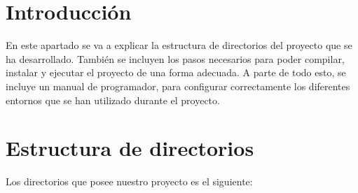
\section{Introducción}

En este apartado se va a explicar la estructura de directorios del proyecto que se ha desarrollado. También se incluyen los pasos necesarios para poder compilar, instalar y ejecutar el proyecto de una forma adecuada. A parte de todo esto, se incluye un manual de programador, para configurar correctamente los diferentes entornos que se han utilizado durante el proyecto.

\section{Estructura de directorios}

Los directorios que posee nuestro proyecto es el siguiente:

